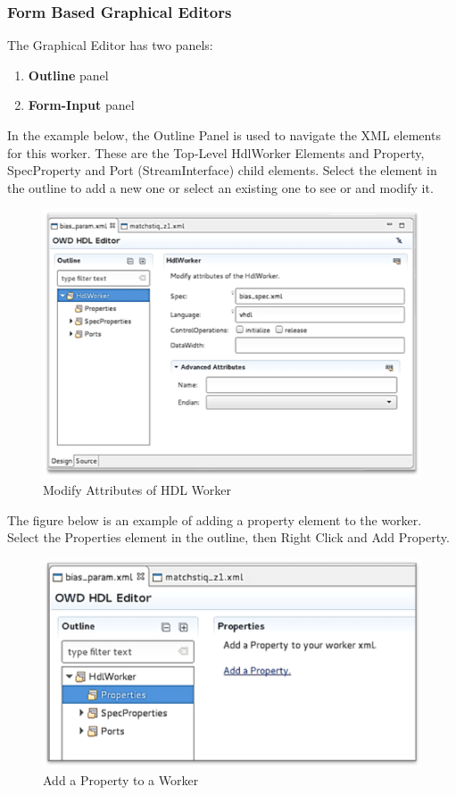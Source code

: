 \documentclass[10pt, a4paper, oneside]{article}
\begin{document}
\subsubsection{Form Based Graphical Editors}
The Graphical Editor has two panels:
\begin{enumerate}
\item \textbf{Outline} panel
\item \textbf{Form-Input} panel
\end{enumerate}
In the example below, the Outline Panel is used to navigate the XML elements for this worker. These are the Top-Level HdlWorker Elements and Property, SpecProperty and Port (StreamInterface) child elements. Select the element in the outline to add a new one or select an existing one to see or and modify it.
\begin{figure}[h!]
	\centering
	\caption{Modify Attributes of HDL Worker}\label{fig:ModifyAttributesofHDLWorker}
	\includegraphics[width=.95\textwidth]{ModifyAttribHDLWrkr.png}
 \end{figure}
The figure below is an example of adding a property element to the worker.
Select the Properties element in the outline, then Right Click and Add Property.
\begin{figure}[h!]
	\centering
	\caption{Add a Property to a Worker}\label{fig:AddaPropertyWorker}
	\includegraphics[width=.95\textwidth]{AddaPropertyWorker.png}
 \end{figure}
\end{document}
